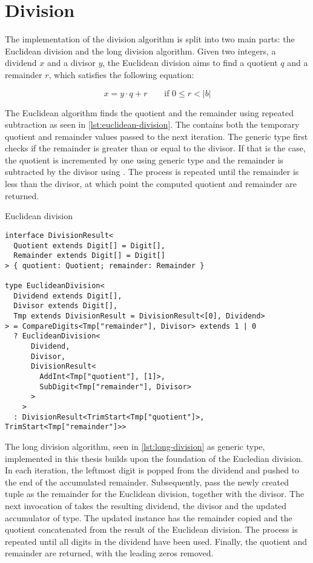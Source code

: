 \section{Division}

The implementation of the division algorithm is split into two main parts: the Euclidean division and the long division algorithm. Given two integers, a dividend $x$ and a divisor $y$, the Euclidean division aims to find a quotient $q$ and a remainder $r$, which satisfies the following equation:

$$x = y\cdot q + r \qquad \text{if } 0 \le r < |b|$$

The Euclidean algorithm finds the quotient and the remainder using repeated subtraction as seen in \ref{lst:euclidean-division}. The  contains both the temporary quotient and remainder values passed to the next iteration. The  generic type first checks if the remainder is greater than or equal to the divisor. If that is the case, the quotient is incremented by one using  generic type and the remainder is subtracted by the divisor using . The process is repeated until the remainder is less than the divisor, at which point the computed quotient and remainder are returned.

\begin{listing}[ht]
\caption{Euclidean division}\label{lst:euclidean-division}
\begin{verbatim}
interface DivisionResult<
  Quotient extends Digit[] = Digit[],
  Remainder extends Digit[] = Digit[]
> { quotient: Quotient; remainder: Remainder }

type EuclideanDivision<
  Dividend extends Digit[],
  Divisor extends Digit[],
  Tmp extends DivisionResult = DivisionResult<[0], Dividend>
> = CompareDigits<Tmp["remainder"], Divisor> extends 1 | 0
  ? EuclideanDivision<
      Dividend,
      Divisor,
      DivisionResult<
        AddInt<Tmp["quotient"], [1]>,
        SubDigit<Tmp["remainder"], Divisor>
      >
    >
  : DivisionResult<TrimStart<Tmp["quotient"]>, TrimStart<Tmp["remainder"]>>
\end{verbatim}
\end{listing}

The long division algorithm, seen in \ref{lst:long-division} as  generic type, implemented in this thesis builds upon the foundation of the Eucledian division. In each iteration, the leftmost digit is popped from the dividend and pushed to the end of the accumulated remainder. Subsequently, pass the newly created tuple as the remainder for the Euclidean division, together with the divisor. The next invocation of  takes the resulting dividend, the divisor and the updated accumulator of  type. The updated  instance has the remainder copied and the quotient concatenated from the result of the Euclidean division. The process is repeated until all digits in the dividend have been used. Finally, the quotient and remainder are returned, with the leading zeros removed.

